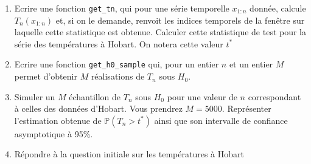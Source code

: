 \documentclass[]{article}
\begin{document}
\begin{enumerate}
\def\labelenumi{\arabic{enumi}.}
\setcounter{enumi}{6}
\item
  Ecrire une fonction \texttt{get\_tn}, qui pour une série temporelle
  \(x_{1:n}\) donnée, calcule \(T_n(x_{1:n})\) et, si on le demande,
  renvoit les indices temporels de la fenêtre sur laquelle cette
  statistique est obtenue. Calculer cette statistique de test pour la
  série des températures à Hobart. On notera cette valeur \(t^*\)
\item
  Ecrire une fonction \texttt{get\_h0\_sample} qui, pour un entier \(n\)
  et un entier \(M\) permet d'obtenir \(M\) réalisations de \(T_n\) sous
  \(H_0\).
\item
  Simuler un \(M\) échantillon de \(T_n\) sous \(H_0\) pour une valeur
  de \(n\) correspondant à celles des données d'Hobart. Vous prendrez
  \(M = 5000\). Représenter l'estimation obtenue de
  \(\mathbb{P}(T_n > t^*)\) ainsi que son intervalle de confiance
  asymptotique à 95\%.
\item
  Répondre à la question initiale sur les températures à Hobart
\end{enumerate}
\end{document}

